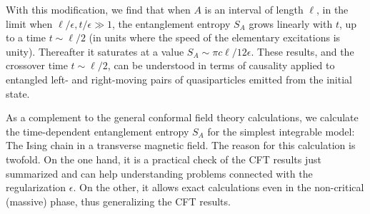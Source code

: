 \documentclass[12pt,preprint,tighten,eqsecnum,aps,floats,psfig,epsfig,amsmath,onecolumn]{revtex4-1}
\def\e{\epsilon}
\begin{document}
With this modification, we find that when $A$ is an interval of length
$\ell$, in the limit when $\ell/\e,t/\e\gg1$, the
entanglement entropy $S_A$ grows linearly with $t$, up to a time 
$t\sim\ell/2$ (in units where the speed of the
elementary excitations is unity). Thereafter 
it saturates at a value
$S_A\sim \pi c\ell/12\e$. These results, and the crossover time 
$t\sim\ell/2$, can be understood in terms of causality applied to
entangled left- and right-moving pairs of quasiparticles emitted
from the initial state. 



As a complement to the general conformal field theory calculations, we 
calculate the time-dependent entanglement entropy $S_A$ 
for the simplest integrable model: The Ising chain in a transverse magnetic 
field. The reason for this calculation is twofold. 
On the one hand, it is a practical check of the CFT results just summarized 
and can help understanding problems connected with the 
regularization $\e$. %
On the other, it allows exact calculations even in the non-critical 
(massive) phase, thus generalizing the CFT results.
\end{document}
